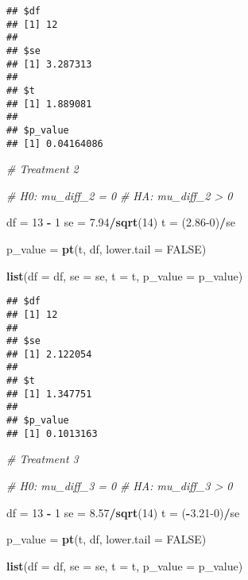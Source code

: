 \documentclass[]{book}
\newenvironment{Shaded}{\begin{snugshade}}{\end{snugshade}}
\newcommand{\CommentTok}[1]{\textcolor[rgb]{0.56,0.35,0.01}{\textit{#1}}}
\newcommand{\DataTypeTok}[1]{\textcolor[rgb]{0.13,0.29,0.53}{#1}}
\newcommand{\DecValTok}[1]{\textcolor[rgb]{0.00,0.00,0.81}{#1}}
\newcommand{\FloatTok}[1]{\textcolor[rgb]{0.00,0.00,0.81}{#1}}
\newcommand{\KeywordTok}[1]{\textcolor[rgb]{0.13,0.29,0.53}{\textbf{#1}}}
\newcommand{\NormalTok}[1]{#1}
\newcommand{\OperatorTok}[1]{\textcolor[rgb]{0.81,0.36,0.00}{\textbf{#1}}}
\newcommand{\OtherTok}[1]{\textcolor[rgb]{0.56,0.35,0.01}{#1}}
\newcommand{\StringTok}[1]{\textcolor[rgb]{0.31,0.60,0.02}{#1}}
\begin{document}
\begin{verbatim}
## $df
## [1] 12
## 
## $se
## [1] 3.287313
## 
## $t
## [1] 1.889081
## 
## $p_value
## [1] 0.04164086
\end{verbatim}

\begin{Shaded}
\begin{Highlighting}[]
\CommentTok{# Treatment 2}

\CommentTok{# H0: mu_diff_2 = 0}
\CommentTok{# HA: mu_diff_2 > 0}

\NormalTok{df =}\StringTok{ }\DecValTok{13} \OperatorTok{-}\StringTok{ }\DecValTok{1} 
\NormalTok{se =}\StringTok{ }\FloatTok{7.94}\OperatorTok{/}\KeywordTok{sqrt}\NormalTok{(}\DecValTok{14}\NormalTok{)}
\NormalTok{t =}\StringTok{ }\NormalTok{(}\FloatTok{2.86}\DecValTok{-0}\NormalTok{)}\OperatorTok{/}\NormalTok{se}

\NormalTok{p_value =}\StringTok{ }\KeywordTok{pt}\NormalTok{(t, df, }\DataTypeTok{lower.tail =} \OtherTok{FALSE}\NormalTok{) }

\KeywordTok{list}\NormalTok{(}\DataTypeTok{df =}\NormalTok{ df, }\DataTypeTok{se =}\NormalTok{ se, }\DataTypeTok{t =}\NormalTok{ t, }\DataTypeTok{p_value =}\NormalTok{ p_value)}
\end{Highlighting}
\end{Shaded}

\begin{verbatim}
## $df
## [1] 12
## 
## $se
## [1] 2.122054
## 
## $t
## [1] 1.347751
## 
## $p_value
## [1] 0.1013163
\end{verbatim}

\begin{Shaded}
\begin{Highlighting}[]
\CommentTok{# Treatment 3}

\CommentTok{# H0: mu_diff_3 = 0}
\CommentTok{# HA: mu_diff_3 > 0}

\NormalTok{df =}\StringTok{ }\DecValTok{13} \OperatorTok{-}\StringTok{ }\DecValTok{1} 
\NormalTok{se =}\StringTok{ }\FloatTok{8.57}\OperatorTok{/}\KeywordTok{sqrt}\NormalTok{(}\DecValTok{14}\NormalTok{)}
\NormalTok{t =}\StringTok{ }\NormalTok{(}\OperatorTok{-}\FloatTok{3.21}\DecValTok{-0}\NormalTok{)}\OperatorTok{/}\NormalTok{se}

\NormalTok{p_value =}\StringTok{ }\KeywordTok{pt}\NormalTok{(t, df, }\DataTypeTok{lower.tail =} \OtherTok{FALSE}\NormalTok{) }

\KeywordTok{list}\NormalTok{(}\DataTypeTok{df =}\NormalTok{ df, }\DataTypeTok{se =}\NormalTok{ se, }\DataTypeTok{t =}\NormalTok{ t, }\DataTypeTok{p_value =}\NormalTok{ p_value)}
\end{Highlighting}
\end{Shaded}
\end{document}
